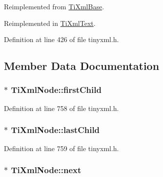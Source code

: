 Reimplemented from \hyperlink{class_ti_xml_base_ab6592e32cb9132be517cc12a70564c4b}{TiXmlBase}.



Reimplemented in \hyperlink{class_ti_xml_text_ab6592e32cb9132be517cc12a70564c4b}{TiXmlText}.



Definition at line 426 of file tinyxml.h.



\subsection{Member Data Documentation}
\hypertarget{class_ti_xml_node_af749fb7f22010b80e8f904c32653d50e}{
\subsubsection[{firstChild}]{$\ast$ {\bf TiXmlNode::firstChild}}}
\label{class_ti_xml_node_af749fb7f22010b80e8f904c32653d50e}


Definition at line 758 of file tinyxml.h.

\hypertarget{class_ti_xml_node_a5b30756d21b304580d22a841ec9d61f8}{
\subsubsection[{lastChild}]{$\ast$ {\bf TiXmlNode::lastChild}}}
\label{class_ti_xml_node_a5b30756d21b304580d22a841ec9d61f8}


Definition at line 759 of file tinyxml.h.

\hypertarget{class_ti_xml_node_a2f329cc993d2d34df76e17dcbb776b45}{
\subsubsection[{next}]{$\ast$ {\bf TiXmlNode::next}}}
\label{class_ti_xml_node_a2f329cc993d2d34df76e17dcbb776b45}


